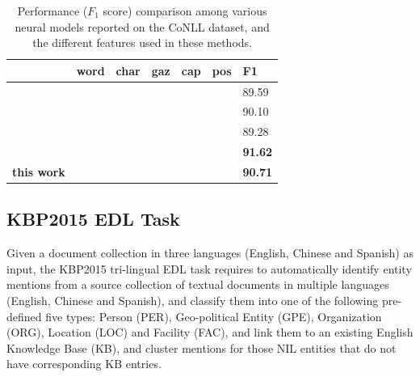 \documentclass[11pt,a4paper]{article}
\newcommand{\cmark}{\ding{51}}
\newcommand{\xmark}{\ding{55}}
\begin{document}
\begin{table}[h!]
	\centering
	\begin{tabular}{|l|lllll|l|}
		\hline
		& word & char & gaz & cap & pos & F1 \\
		\hline\hline
		\cite{collobert2011natural} & \cmark & \xmark & \cmark & \cmark & \xmark & 89.59  \\
		\cite{huang2015bidirectional} &\cmark & \cmark & \cmark & \cmark & \cmark & 90.10 \\
		\cite{rondeau2016lstm}  & \cmark & \xmark & \cmark & \cmark & \cmark & 89.28 \\
		\cite{chiu2016named} & \cmark & \cmark & \cmark & \xmark & \xmark & {\bf 91.62} \\
		\hline \hline
		{\bf this work} & \cmark & \cmark & \xmark & \xmark & \xmark & {\bf 90.71} \\
		\hline
	\end{tabular}
	\caption{Performance ($F_1$ score) comparison among various neural models reported on the CoNLL dataset, and the different features used in these methods.}
	\label{tbl:nn-cmp:CoNLL03}
\end{table}


\subsection{KBP2015 EDL Task}

Given a document collection in three languages (English, Chinese and Spanish) as input, the KBP2015  tri-lingual EDL task \cite{kbpoverview2015}  requires to automatically identify entity mentions from a
source collection of textual documents in multiple
languages (English, Chinese and Spanish), and 
classify them into one of the following pre-defined
five types: Person (PER), Geo-political Entity
(GPE), Organization (ORG), Location (LOC)
and Facility (FAC), and link them to an existing
English Knowledge Base (KB), and cluster
mentions for those NIL entities that do not have
corresponding KB entries.

\begin{table}
	\caption{Entity Discovery Performance of our method on the KBP2015 EDL evaluation data, with comparison to the best system in KBP2015 official evaluation.}
	\label{Table_KBP2015_ED}
\end{table}
\end{document}

